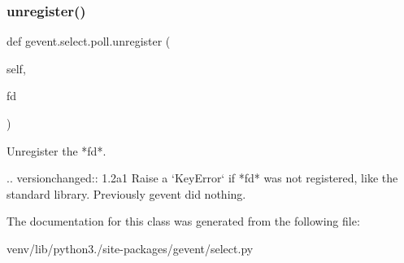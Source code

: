 \subsubsection{\texorpdfstring{unregister()}{unregister()}}
{\footnotesize\ttfamily def gevent.\+select.\+poll.\+unregister (\begin{DoxyParamCaption}\item[{}]{self,  }\item[{}]{fd }\end{DoxyParamCaption})}

\begin{DoxyVerb}Unregister the *fd*.

.. versionchanged:: 1.2a1
   Raise a `KeyError` if *fd* was not registered, like the standard
   library. Previously gevent did nothing.
\end{DoxyVerb}
 

The documentation for this class was generated from the following file\+:\begin{DoxyCompactItemize}
\item 
venv/lib/python3./site-\/packages/gevent/select.\+py\end{DoxyCompactItemize}
